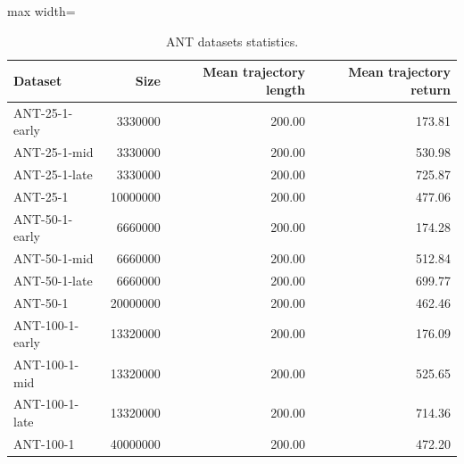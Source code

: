 \documentclass{article}
\begin{document}
\begin{table}[ht]
    \label{tab:ant_stats}
    \begin{center}
        \caption{ANT datasets statistics.}
    \begin{small}
    \begin{adjustbox}{max width=\columnwidth}
		\begin{tabular}{l|rrr}
		\toprule
	\textbf{Dataset} & \textbf{Size} & \textbf{Mean trajectory length} & \textbf{Mean trajectory return}\\
\midrule
ANT-25-1-early & 3330000 & 200.00 & 173.81\\
ANT-25-1-mid & 3330000 & 200.00 & 530.98\\
ANT-25-1-late & 3330000 & 200.00 & 725.87 \\
ANT-25-1 & 10000000 & 200.00 & 477.06 \\
\midrule
ANT-50-1-early & 6660000 & 200.00 & 174.28 \\
ANT-50-1-mid & 6660000 & 200.00 & 512.84 \\
ANT-50-1-late & 6660000 & 200.00 & 699.77 \\
ANT-50-1 & 20000000 & 200.00 & 462.46 \\
\midrule
ANT-100-1-early & 13320000 & 200.00 & 176.09 \\
ANT-100-1-mid & 13320000 & 200.00 & 525.65 \\
ANT-100-1-late & 13320000 & 200.00 & 714.36 \\
ANT-100-1 & 40000000 & 200.00 & 472.20 \\
\bottomrule
\end{tabular}
        \end{adjustbox}
    \end{small}
    \end{center}
    \vskip -0.1in
\end{table}
\end{document}

